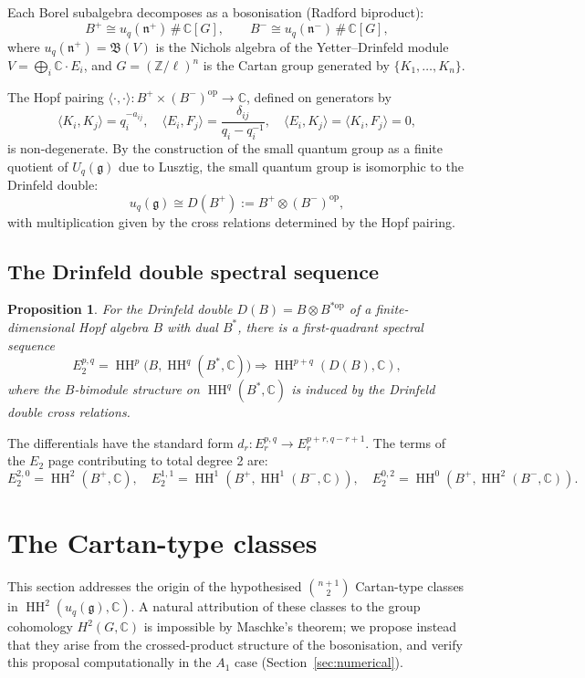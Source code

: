 \documentclass[11pt,letterpaper]{amsart}
\theoremstyle{plain}
\newtheorem{proposition}[theorem]{Proposition}
\theoremstyle{definition}
\theoremstyle{remark}
\newcommand{\HH}{\operatorname{HH}}
\newcommand{\CC}{\mathbb{C}}
\newcommand{\ZZ}{\mathbb{Z}}
\newcommand{\bplus}{B^{+}}
\newcommand{\bminus}{B^{-}}
\begin{document}
Each Borel subalgebra decomposes as a bosonisation (Radford biproduct):
\[
\bplus \cong u_q(\mathfrak{n}^+) \, \# \, \CC[G], \qquad \bminus \cong u_q(\mathfrak{n}^-) \, \# \, \CC[G],
\]
where $u_q(\mathfrak{n}^+) = \mathfrak{B}(V)$ is the Nichols algebra of the Yetter--Drinfeld module $V = \bigoplus_i \CC \cdot E_i$, and $G = (\ZZ/\ell)^n$ is the Cartan group generated by $\{K_1, \ldots, K_n\}$.

The Hopf pairing $\langle \cdot, \cdot \rangle \colon \bplus \times (\bminus)^{\mathrm{op}} \to \CC$, defined on generators by
\[
\langle K_i, K_j \rangle = q_i^{-a_{ij}}, \quad \langle E_i, F_j \rangle = \frac{\delta_{ij}}{q_i - q_i^{-1}}, \quad \langle E_i, K_j \rangle = \langle K_i, F_j \rangle = 0,
\]
is non-degenerate. By the construction of the small quantum group as a finite quotient of $U_q(\mathfrak{g})$ due to Lusztig\cite{Lus93}, the small quantum group is isomorphic to the Drinfeld double:
\[
u_q(\mathfrak{g}) \cong D(\bplus) := \bplus \otimes (\bminus)^{\mathrm{op}},
\]
with multiplication given by the cross relations determined by the Hopf pairing.

\figTriangular

\subsection{The Drinfeld double spectral sequence}

\begin{proposition}
\label{prop:ss}
For the Drinfeld double $D(B) = B \otimes B^{*\mathrm{op}}$ of a finite-dimensional Hopf algebra $B$ with dual $B^*$, there is a first-quadrant spectral sequence
\begin{equation}
\label{eq:ss}
E_2^{p,q} = \HH^p\!\bigl(B, \HH^q(B^*, \CC)\bigr) \Longrightarrow \HH^{p+q}(D(B), \CC),
\end{equation}
where the $B$-bimodule structure on $\HH^q(B^*, \CC)$ is induced by the Drinfeld double cross relations.
\end{proposition}

The differentials have the standard form $d_r \colon E_r^{p,q} \to E_r^{p+r, q-r+1}$. The terms of the $E_2$ page contributing to total degree 2 are:
\[
E_2^{2,0} = \HH^2(\bplus, \CC), \quad E_2^{1,1} = \HH^1(\bplus, \HH^1(\bminus, \CC)), \quad E_2^{0,2} = \HH^0(\bplus, \HH^2(\bminus, \CC)).
\]

\figSpectralSequence

\section{The Cartan-type classes}
\label{sec:cartan}
This section addresses the origin of the hypothesised $\binom{n+1}{2}$ Cartan-type classes in $\HH^2(u_q(\mathfrak{g}), \CC)$. A natural attribution of these classes to the group cohomology $H^2(G, \CC)$ is impossible by Maschke's theorem; we propose instead that they arise from the crossed-product structure of the bosonisation, and verify this proposal computationally in the $A_1$ case (Section~\ref{sec:numerical}).
\end{document}
